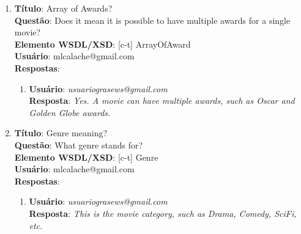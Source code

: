 \begin{tcolorbox}
    \begin{enumerate}[label=(Q\arabic*)]
        
        \setlength{\parskip}{0.55cm}
    
		
        \item 
        \textbf{Título}: Array of Awards?
        \\
        \textbf{Questão}: Does it mean it is possible to have multiple awards for a single movie?
        \\
        \textbf{Elemento WSDL/XSD}: [c-t] ArrayOfAward
        \\
        \textbf{Usuário}: mlcalache@gmail.com
        \\
        \textbf{Respostas}:
        \begin{enumerate}
            \item
                \textbf{Usuário}: \textit{usuariograsews@gmail.com}
                \\
                \textbf{Resposta}: \textit{Yes. A movie can have multiple awards, such as Oscar and Golden Globe awards.}
        \end{enumerate}
        
        
        \item 
        \textbf{Título}: Genre meaning?
        \\
        \textbf{Questão}: What genre stands for?
        \\
        \textbf{Elemento WSDL/XSD}: [c-t] Genre
        \\
        \textbf{Usuário}: mlcalache@gmail.com
        \\
        \textbf{Respostas}:
        \begin{enumerate}
            \item
                \textbf{Usuário}: \textit{usuariograsews@gmail.com}
                \\
                \textbf{Resposta}: \textit{This is the movie category, such as Drama, Comedy, SciFi, etc.}
        \end{enumerate}

        

\end{enumerate}
\end{tcolorbox}
